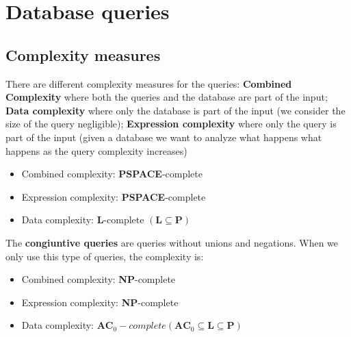 \section{Database queries}
\subsection{Complexity measures}
There are different complexity measures for the queries:
\textbf{Combined Complexity} where both the queries and the database are part of the input; \textbf{Data complexity} where only the database is part of the input (we consider the size of the query negligible); \textbf{Expression complexity} where only the query is part of the input (given a database we want to analyze what happens what happens as the query complexity increases)
\begin{defbox}[Theorem]
    \begin{itemize}
        \item Combined complexity: \textbf{PSPACE}-complete
        \item Expression complexity: \textbf{PSPACE}-complete
        \item Data complexity: \textbf{L}-complete $(\textbf{L}\subseteq \textbf{P})$
    \end{itemize}
\end{defbox}
The \textbf{congiuntive queries} are queries without unions and negations. When we only use this type of queries, the complexity is: 
\begin{itemize}
        \item Combined complexity: \textbf{NP}-complete
        \item Expression complexity: \textbf{NP}-complete
        \item Data complexity: $\textbf{AC}_0-complete(\textbf{AC}_0\subseteq\textbf{L}\subseteq \textbf{P})$
\end{itemize}

